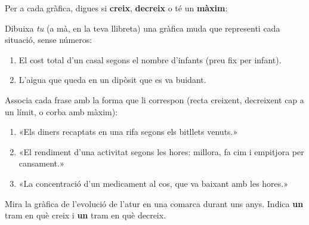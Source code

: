 \begin{exercicis}
\begin{exlist}
  \item Per a cada gràfica, digues si \textbf{creix}, \textbf{decreix} o té un
        \textbf{màxim}:

        \begin{center}
\end{center}

  \item Dibuixa \emph{tu} (a mà, en la teva llibreta) una gràfica muda que
        representi cada situació, sense números:
        \begin{enumerate}[label=\alph*), leftmargin=1.6em, topsep=2pt]
          \item El cost total d'un casal segons el nombre d'infants (preu fix per infant).
          \item L'aigua que queda en un dipòsit que es va buidant.
        \end{enumerate}
  \item Associa cada frase amb la forma que li correspon (recta creixent,
        decreixent cap a un límit, o corba amb màxim):
        \begin{enumerate}[label=\alph*), leftmargin=1.6em, topsep=2pt]
          \item «Els diners recaptats en una rifa segons els bitllets venuts.»
          \item «El rendiment d'una activitat segons les hores: millora, fa cim i
                empitjora per cansament.»
          \item «La concentració d'un medicament al cos, que va baixant amb les hores.»
        \end{enumerate}
  \item Mira la gràfica de l'evolució de l'atur en una comarca durant uns anys.
        Indica \textbf{un} tram en què creix i \textbf{un} tram en què decreix.


\end{exlist}
\end{exercicis}
